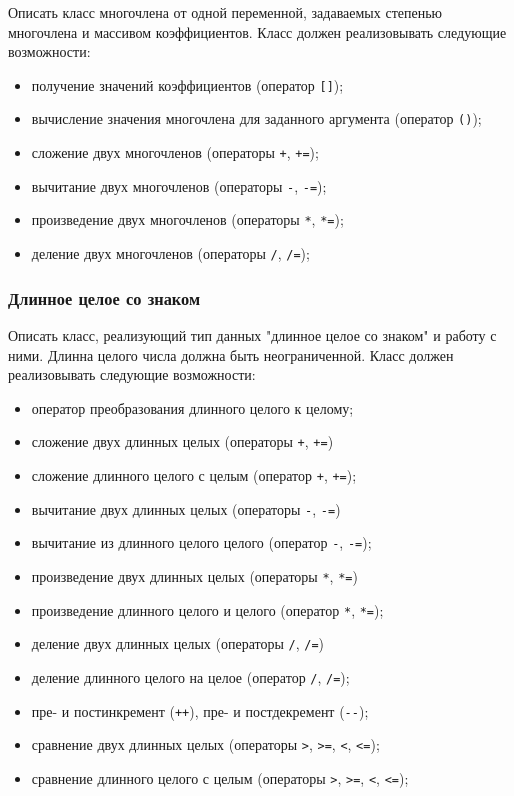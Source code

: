 \documentclass[a4paper,12pt]{article}
\begin{document}
Описать класс многочлена от одной переменной, задаваемых степенью
многочлена и массивом коэффициентов. Класс должен реализовывать
следующие возможности:

\begin{itemize}
\item получение значений коэффициентов (оператор \lstinline|[]|);
\item вычисление значения многочлена для заданного аргумента (оператор
  \lstinline|()|);
\item сложение двух многочленов (операторы \lstinline|+|,
  \lstinline|+=|);
\item вычитание двух многочленов (операторы \lstinline|-|,
  \lstinline|-=|);
\item произведение двух многочленов (операторы \lstinline|*|,
  \lstinline|*=|);
\item деление двух многочленов (операторы \lstinline|/|,
  \lstinline|/=|);
\end{itemize}

\subsubsection{Длинное целое со знаком}

Описать класс, реализующий тип данных "длинное целое со знаком" и
работу с ними. Длинна целого числа должна быть неограниченной. Класс
должен реализовывать следующие возможности:

\begin{itemize}
\item оператор преобразования длинного целого к целому;
\item сложение двух длинных целых (операторы \lstinline|+|,
  \lstinline|+=|)
\item сложение длинного целого с целым (оператор \lstinline|+|,
  \lstinline|+=|);
\item вычитание двух длинных целых (операторы \lstinline|-|,
  \lstinline|-=|)
\item вычитание из длинного целого целого (оператор \lstinline|-|,
  \lstinline|-=|);
\item произведение двух длинных целых (операторы \lstinline|*|,
  \lstinline|*=|)
\item произведение длинного целого и целого (оператор \lstinline|*|,
  \lstinline|*=|);
\item деление двух длинных целых (операторы \lstinline|/|,
  \lstinline|/=|)
\item деление длинного целого на целое (оператор \lstinline|/|,
  \lstinline|/=|);
\item пре- и постинкремент (\lstinline|++|), пре- и постдекремент
  (\lstinline|--|);
\item сравнение двух длинных целых (операторы \lstinline|>|,
  \lstinline|>=|, \lstinline|<|, \lstinline|<=|);
\item сравнение длинного целого с целым (операторы \lstinline|>|,
  \lstinline|>=|, \lstinline|<|, \lstinline|<=|);
\end{itemize}
\end{document}
